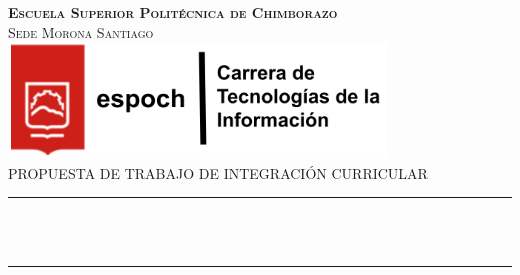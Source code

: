 \begin{titlepage}

\newcommand{\HRule}{\rule{\linewidth}{0.5mm}} %



\center %
\textsc{\LARGE \textbf{Escuela Superior Politécnica de Chimborazo}}\\[0.2cm] %
\textsc{\Large Sede Morona Santiago}\\[1.5cm] %

\includegraphics[width=10cm]{title/espochTI.png}\\[1.5cm] %
 

\textsc{\large PROPUESTA DE
TRABAJO DE INTEGRACIÓN CURRICULAR}\\[0.5cm] %

\makeatletter
{\color{red}\HRule} \\[0.6cm]
{ \huge\bfseries \@title}\\[0.6cm] %
{\color{red}\HRule}\\[1.5cm]
 


\end{titlepage}
